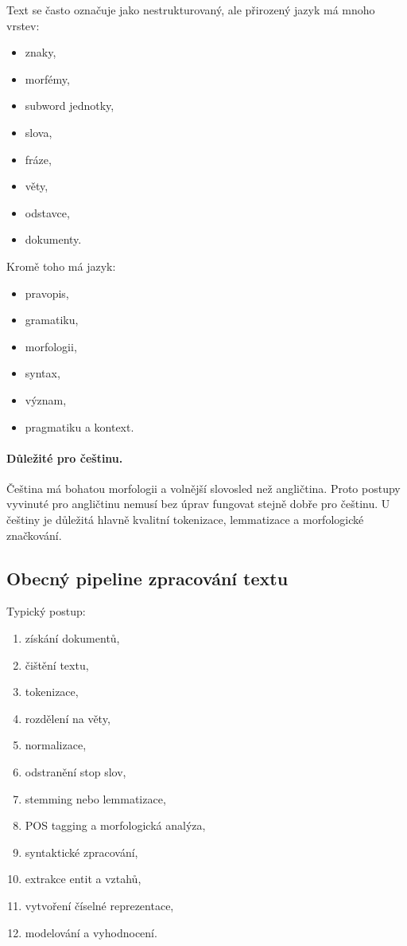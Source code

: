Text se často označuje jako nestrukturovaný, ale přirozený jazyk má mnoho vrstev:
\begin{itemize}
    \item znaky,
    \item morfémy,
    \item subword jednotky,
    \item slova,
    \item fráze,
    \item věty,
    \item odstavce,
    \item dokumenty.
\end{itemize}

Kromě toho má jazyk:
\begin{itemize}
    \item pravopis,
    \item gramatiku,
    \item morfologii,
    \item syntax,
    \item význam,
    \item pragmatiku a kontext.
\end{itemize}

\paragraph{Důležité pro češtinu.}
Čeština má bohatou morfologii a volnější slovosled než angličtina. Proto postupy vyvinuté pro angličtinu
nemusí bez úprav fungovat stejně dobře pro češtinu. U češtiny je důležitá hlavně kvalitní tokenizace,
lemmatizace a morfologické značkování.

\subsection{Obecný pipeline zpracování textu}

Typický postup:
\begin{enumerate}
    \item získání dokumentů,
    \item čištění textu,
    \item tokenizace,
    \item rozdělení na věty,
    \item normalizace,
    \item odstranění stop slov,
    \item stemming nebo lemmatizace,
    \item POS tagging a morfologická analýza,
    \item syntaktické zpracování,
    \item extrakce entit a vztahů,
    \item vytvoření číselné reprezentace,
    \item modelování a vyhodnocení.
\end{enumerate}

